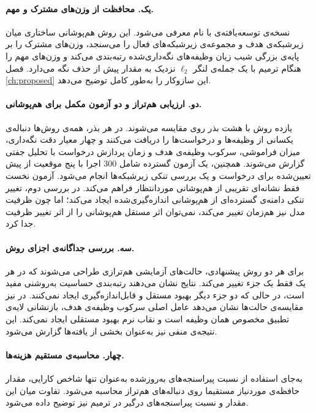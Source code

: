 \paragraph{یک. محافظت از وزن‌های مشترک و مهم.} نسخه‌ی توسعه‌یافته‌ی  با نام  معرفی می‌شود. این روش هم‌پوشانی ساختاری میان زیرشبکه‌ی هدف و مجموعه‌ی زیرشبکه‌های فعال را می‌سنجد، وزن‌های مشترک را بر پایه‌ی بزرگی شیب زیان وظیفه‌های نگه‌داری‌شده رتبه‌بندی می‌کند و وزن‌های مهم را هنگام ترمیم با یک جمله‌ی لنگر $\ell_2$ نزدیک به مقدار پیش از حذف نگه می‌دارد. فصل \ref{ch:proposed} این سازوکار را به‌طور کامل توضیح می‌دهد.

\paragraph{دو. ارزیابی هم‌تراز و دو آزمون مکمل برای هم‌پوشانی.} یازده روش با هشت بذر روی  مقایسه می‌شوند. در هر بذر، همه‌ی روش‌ها دنباله‌ی یکسانی از وظیفه‌ها و درخواست‌ها را دریافت می‌کنند و چهار معیار دقت نگه‌داری، میزان فراموشی، سرکوب وظیفه‌ی هدف و زمان پردازش درخواست با تحلیل جفتی گزارش می‌شوند. همچنین، یک آزمون گسترده شامل $300$ اجرا با پنج موقعیت از پیش تعیین‌شده برای درخواست و یک بررسی تنکی زیرشبکه‌ها انجام می‌شود. آزمون نخست فقط نشانه‌ای تقریبی از هم‌پوشانی موردانتظار فراهم می‌کند. در بررسی دوم، تغییر تنکی دامنه‌ی گسترده‌ای از هم‌پوشانی اندازه‌گیری‌شده ایجاد می‌کند؛ اما چون ظرفیت مدل نیز هم‌زمان تغییر می‌کند، نمی‌توان اثر مستقل هم‌پوشانی را از اثر تغییر ظرفیت جدا کرد.

\paragraph{سه. بررسی جداگانه‌ی اجزای روش.} برای هر دو روش پیشنهادی، حالت‌های آزمایشی هم‌ترازی طراحی می‌شوند که در هر یک فقط یک جزء تغییر می‌کند. نتایج  نشان می‌دهند رتبه‌بندی حساسیت به‌روشنی مفید است، در حالی که دو جزء دیگر بهبود مستقل و قابل‌اندازه‌گیری ایجاد نمی‌کنند. در  نیز مقایسه‌ی حالت‌ها نشان می‌دهد عامل اصلی سرکوب وظیفه‌ی هدف، بازنشانی لایه‌ی تطبیق مخصوص همان وظیفه است و نقاب نرم بهبود مستقلی ایجاد نمی‌کند. این نتیجه‌ی منفی نیز به‌عنوان بخشی از یافته‌ها گزارش می‌شود.

\paragraph{چهار. محاسبه‌ی مستقیم هزینه‌ها.} به‌جای استفاده از نسبت پیراسنجه‌های به‌روزشده به‌عنوان تنها شاخص کارایی، مقدار حافظه‌ی موردنیاز مستقیما روی دنباله‌های هم‌تراز محاسبه می‌شود. تفاوت میان این مقدار و نسبت پیراسنجه‌های درگیر در ترمیم نیز توضیح داده می‌شود.

